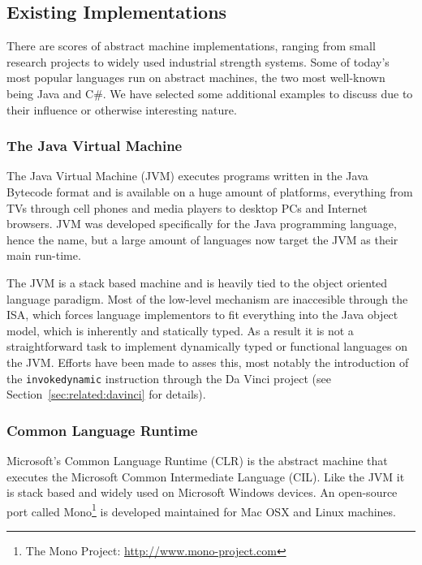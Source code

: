\subsection{Existing Implementations}

There are scores of abstract machine implementations, ranging from small
research projects to widely used industrial strength systems. Some of today's
most popular languages run on abstract machines, the two most well-known being
Java and C\#\cite{langpop}. We have selected some additional examples to discuss
due to their influence or otherwise interesting nature.

\subsubsection{The Java Virtual Machine}

The Java Virtual Machine (JVM) executes programs written in the Java Bytecode
format and is available on a huge amount of platforms, everything from TVs
through cell phones and media players to desktop PCs and Internet
browsers\cite{aboutjava}. JVM was developed specifically for the Java
programming language, hence the name, but a large amount of languages now target
the JVM as their main run-time.

The JVM is a stack based machine and is heavily tied to the object oriented
language paradigm. Most of the low-level mechanism are inaccesible through the
ISA, which forces language implementors to fit everything into the Java object
model, which is inherently  and statically typed. As a
result it is not a straightforward task to implement dynamically typed or
functional languages on the JVM. Efforts have been made to asses this, most
notably the introduction of the \texttt{invokedynamic} instruction through the
Da Vinci project (see Section~\ref{sec:related:davinci} for details).

\subsubsection{Common Language Runtime}

Microsoft's Common Language Runtime (CLR) is the abstract machine that executes
the Microsoft Common Intermediate Language (CIL). Like the JVM it is stack based
and widely used on Microsoft Windows devices. An open-source port called
Mono\footnote{The Mono Project: \url{http://www.mono-project.com}} is developed
maintained for Mac OSX and Linux machines.

